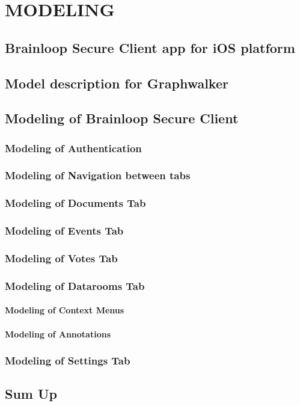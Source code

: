 \chapter{MODELING}
\label{chapter:modeling}


\section{Brainloop Secure Client app for iOS platform} 
\section{Model description for Graphwalker}
\section{Modeling of Brainloop Secure Client}
\subsection{Modeling of Authentication}
\subsection{Modeling of Navigation between tabs}
\subsection{Modeling of Documents Tab}
\subsection{Modeling of Events Tab}
\subsection{Modeling of Votes Tab}
\subsection{Modeling of Datarooms Tab}
\subsubsection{Modeling of Context Menus}
\subsubsection{Modeling of Annotations}
\subsection{Modeling of Settings Tab}


\section{Sum Up}
















